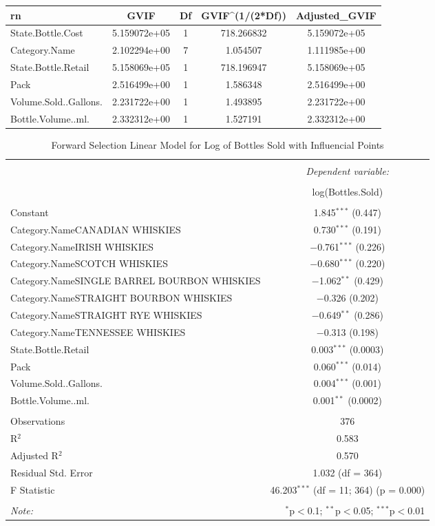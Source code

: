 \documentclass[]{elsarticle} %
\begin{document}
\begin{longtable}[]{@{}lcccc@{}}
\toprule
rn & GVIF & Df & GVIF\^{}(1/(2*Df)) & Adjusted\_GVIF\tabularnewline
\midrule
\endhead
State.Bottle.Cost & 5.159072e+05 & 1 & 718.266832 &
5.159072e+05\tabularnewline
Category.Name & 2.102294e+00 & 7 & 1.054507 &
1.111985e+00\tabularnewline
State.Bottle.Retail & 5.158069e+05 & 1 & 718.196947 &
5.158069e+05\tabularnewline
Pack & 2.516499e+00 & 1 & 1.586348 & 2.516499e+00\tabularnewline
Volume.Sold..Gallons. & 2.231722e+00 & 1 & 1.493895 &
2.231722e+00\tabularnewline
Bottle.Volume..ml. & 2.332312e+00 & 1 & 1.527191 &
2.332312e+00\tabularnewline
\bottomrule
\end{longtable}

\begin{table}[!htbp] \centering 
  \caption{Forward Selection Linear Model for Log of Bottles Sold with Influencial Points} 
  \label{} 
\normalsize 
\begin{tabular}{@{\extracolsep{5pt}}lc} 
\\[-1.8ex]\hline 
\hline \\[-1.8ex] 
 & \multicolumn{1}{c}{\textit{Dependent variable:}} \\ 
\cline{2-2} 
\\[-1.8ex] & log(Bottles.Sold) \\ 
\hline \\[-1.8ex] 
 Constant & 1.845$^{***}$ (0.447) \\ 
  Category.NameCANADIAN WHISKIES & 0.730$^{***}$ (0.191) \\ 
  Category.NameIRISH WHISKIES & $-$0.761$^{***}$ (0.226) \\ 
  Category.NameSCOTCH WHISKIES & $-$0.680$^{***}$ (0.220) \\ 
  Category.NameSINGLE BARREL BOURBON WHISKIES & $-$1.062$^{**}$ (0.429) \\ 
  Category.NameSTRAIGHT BOURBON WHISKIES & $-$0.326 (0.202) \\ 
  Category.NameSTRAIGHT RYE WHISKIES & $-$0.649$^{**}$ (0.286) \\ 
  Category.NameTENNESSEE WHISKIES & $-$0.313 (0.198) \\ 
  State.Bottle.Retail & 0.003$^{***}$ (0.0003) \\ 
  Pack & 0.060$^{***}$ (0.014) \\ 
  Volume.Sold..Gallons. & 0.004$^{***}$ (0.001) \\ 
  Bottle.Volume..ml. & 0.001$^{**}$ (0.0002) \\ 
 \hline \\[-1.8ex] 
Observations & 376 \\ 
R$^{2}$ & 0.583 \\ 
Adjusted R$^{2}$ & 0.570 \\ 
Residual Std. Error & 1.032 (df = 364) \\ 
F Statistic & 46.203$^{***}$ (df = 11; 364)  (p = 0.000) \\ 
\hline 
\hline \\[-1.8ex] 
\textit{Note:}  & \multicolumn{1}{r}{$^{*}$p$<$0.1; $^{**}$p$<$0.05; $^{***}$p$<$0.01} \\ 
\end{tabular} 
\end{table}
\end{document}
